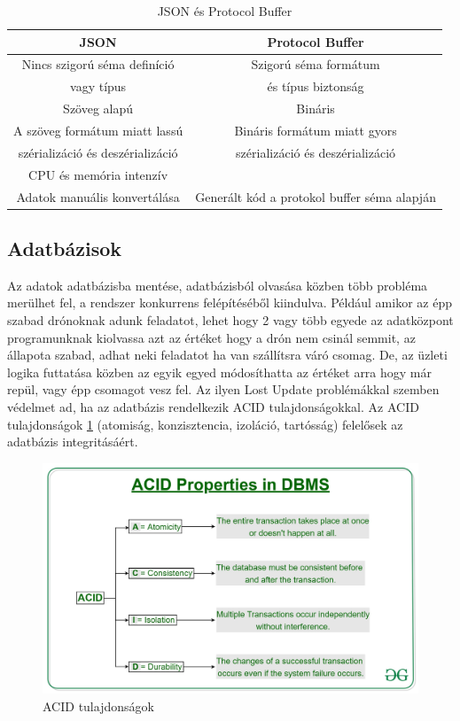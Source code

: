 \begin{table}[h]
    \centering
    \caption{JSON és Protocol Buffer}
    \label{tab:message-exchange}
    \begin{tabular}{|c|c|}
        \hline
        JSON & Protocol Buffer \\
        \hline
        Nincs szigorú séma definíció & Szigorú séma formátum \\
        vagy típus & és típus biztonság \\
        \hline
        Szöveg alapú & Bináris \\
        \hline
        A szöveg formátum miatt lassú & Bináris formátum miatt gyors\\
        szérializáció és deszérializáció & szérializáció és deszérializáció\\
        CPU és memória intenzív & \\
        \hline
        Adatok manuális konvertálása & Generált kód a protokol buffer séma alapján\\
        \hline
    \end{tabular}
\end{table}

\subsection{Adatbázisok}
Az adatok adatbázisba mentése, adatbázisból olvasása közben több probléma merülhet fel, a rendszer konkurrens felépítéséből kiindulva.
Például amikor az épp szabad drónoknak adunk feladatot, lehet hogy 2 vagy több egyede az adatközpont programunknak kiolvassa azt az értéket hogy
a drón nem csinál semmit, az állapota szabad, adhat neki feladatot ha van szállítsra váró csomag. De, az üzleti logika futtatása közben az egyik egyed módosíthatta
az értéket arra hogy már repül, vagy épp csomagot vesz fel. Az ilyen Lost Update problémákkal szemben védelmet ad, ha az adatbázis rendelkezik ACID tulajdonságokkal.
Az ACID tulajdonságok \ref{fig:acid} (atomiság, konzisztencia, izoláció, tartósság) felelősek az adatbázis integritásáért.

\begin{figure}[h]
    \centering
    \includegraphics[scale=0.15]{images/ACID-Properties.jpg}
    \caption{ACID tulajdonságok}
    \label{fig:acid}
\end{figure}


